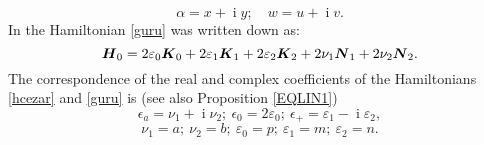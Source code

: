 \documentclass[12pt]{amsart}
\numberwithin{equation}{section}
\theoremstyle{definition}
\begin{document}
\begin{equation}\label{corT}
\alpha= x+{\operatorname{i}} y; \quad w=u+{\operatorname{i}} v. 
\end{equation}
In \cite{cezar}  the Hamiltonian \eqref{guru} was written down as:
\begin{equation}\label{hcezar}
{{\mbox{\boldmath{${H}$}}}}_0=2\varepsilon_0{{\mbox{\boldmath{${K}$}}}}_0+2\varepsilon_1{{\mbox{\boldmath{${K}$}}}}_1+ 2\varepsilon_2{{\mbox{\boldmath{${K}$}}}}_2 + 2\nu_1{{\mbox{\boldmath{${N}$}}}}_1  + 2\nu_2{{\mbox{\boldmath{${N}$}}}}_2. 
\end{equation}
 The correspondence of the real and complex coefficients of the
Hamiltonians \eqref{hcezar}  and \eqref{guru} is (see also Proposition \ref{EQLIN1})
\begin{equation}\label{corc}
\epsilon_a=\nu_1+{\operatorname{i}} \nu_2; ~\epsilon_0=2 \varepsilon_0; ~ \epsilon_+=\varepsilon_1-{\operatorname{i}} \varepsilon_2, 
\end{equation}
\begin{equation}\label{corcr}
\nu_1=a; ~\nu_2=b; ~\varepsilon_0=p;~ \varepsilon_1=m;~\varepsilon_2=n. 
\end{equation}
\end{document}

